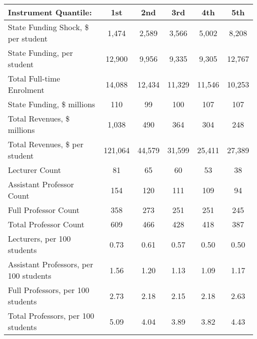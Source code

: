 \begin{tabular}{lccccc}
  \hline
Instrument Quantile: & 1st & 2nd & 3rd & 4th & 5th \\ 
  \hline
State Funding Shock, \$ per student & 1,474 & 2,589 & 3,566 & 5,002 & 8,208 \\ 
  State Funding, per student & 12,900 & 9,956 & 9,335 & 9,305 & 12,767 \\ 
  Total Full-time Enrolment & 14,088 & 12,434 & 11,329 & 11,546 & 10,253 \\ 
  State Funding, \$ millions & 110 & 99 & 100 & 107 & 107 \\ 
  Total Revenues, \$ millions & 1,038 & 490 & 364 & 304 & 248 \\ 
  Total Revenues, \$ per student & 121,064 & 44,579 & 31,599 & 25,411 & 27,389 \\ 
  Lecturer Count & 81 & 65 & 60 & 53 & 38 \\ 
  Assistant Professor Count & 154 & 120 & 111 & 109 & 94 \\ 
  Full Professor Count & 358 & 273 & 251 & 251 & 245 \\ 
  Total Professor Count & 609 & 466 & 428 & 418 & 387 \\ 
  Lecturers, per 100 students & 0.73 & 0.61 & 0.57 & 0.50 & 0.50 \\ 
  Assistant Professors, per 100 students & 1.56 & 1.20 & 1.13 & 1.09 & 1.17 \\ 
  Full Professors, per 100 students & 2.73 & 2.18 & 2.15 & 2.18 & 2.63 \\ 
  Total Professors, per 100 students & 5.09 & 4.04 & 3.89 & 3.82 & 4.43 \\ 
   \hline
\end{tabular}
